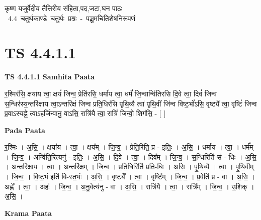 \documentclass[17pt]{extarticle}
\begin{document}
\begin{titlepage}
    \begin{center}
 
\begin{sanskrit}
    { \Large
    कृष्ण यजुर्वेदीय तैत्तिरीय संहिता,पद,जटा,घन पाठः 
    }
    \\
    \vspace{2.5cm}
    \mbox{ \Large
    4.4      चतुर्थकाण्डे चतुर्थः प्रश्नः - पञ्चमचितिशेषनिरूपणं   }
\end{sanskrit}
\end{center}

\end{titlepage}
\tableofcontents
{}
\pagebreak


\section{ TS 4.4.1.1 }

\textbf{TS 4.4.1.1 } \newline
\textbf{Samhita Paata} \newline

र॒श्मिर॑सि॒ क्षया॑य त्वा॒ क्षयं॑ जिन्व॒ प्रेति॑रसि॒ धर्मा॑य त्वा॒ धर्मं॑ जि॒न्वान्वि॑तिरसि दि॒वे त्वा॒ दिवं॑ जिन्व स॒न्धिर॑स्य॒न्तरि॑क्षाय त्वा॒ऽन्तरि॑क्षं जिन्व प्रति॒धिर॑सि पृथि॒व्यै त्वा॑ पृथि॒वीं जि॑न्व विष्ट॒भों॑ऽसि॒ वृष्ट्यै᳚ त्वा॒ वृष्टिं॑ जिन्व प्र॒वाऽस्यह्ने॒ त्वाऽह॑र्जिन्वानु॒ वाऽसि॒ रात्रि॑यै त्वा॒ रात्रिं॑ जिन्वो॒ शिग॑सि॒ - [  ] \newline

\textbf{Pada Paata} \newline

र॒श्मिः । अ॒सि॒ । क्षया॑य । त्वा॒ । क्षय᳚म् । जि॒न्व॒ । प्रेति॒रिति॒ प्र - इ॒तिः॒ । अ॒सि॒ । धर्मा॑य । त्वा॒ । धर्म᳚म् । जि॒न्व॒ । अन्वि॑ति॒रित्यनु॑ - इ॒तिः॒ । अ॒सि॒ । दि॒वे । त्वा॒ । दिव᳚म् । जि॒न्व॒ । स॒न्धिरिति॑ सं - धिः । अ॒सि॒ । अ॒न्तरि॑क्षाय । त्वा॒ । अ॒न्तरि॑क्षम् । जि॒न्व॒ । प्र॒ति॒धिरिति॑ प्रति-धिः । अ॒सि॒ । पृ॒थि॒व्यै । त्वा॒ । पृ॒थि॒वीम् । जि॒न्व॒ । वि॒ष्ट॒भं इति॑ वि-स्त॒भंः । अ॒सि॒ । वृष्ट्यै᳚ । त्वा॒ । वृष्टि᳚म् । जि॒न्व॒ । प्र॒वेति॑ प्र - वा । अ॒सि॒ । अह्ने᳚ । त्वा॒ । अहः॑ । जि॒न्व॒ । अ॒नु॒वेत्य॑नु - वा । अ॒सि॒ । रात्रि॑यै । त्वा॒ । रात्रि᳚म् । जि॒न्व॒ । उ॒शिक् । अ॒सि॒ ।  \newline


\textbf{Krama Paata} \newline
\end{document}
